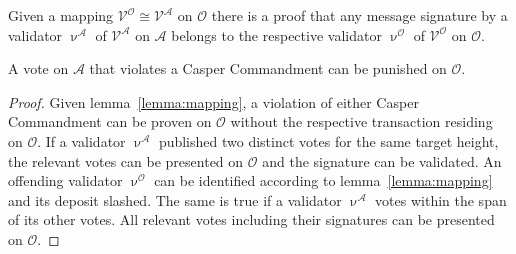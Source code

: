\documentclass[12pt,a4paper]{article}
\newcommand{\A}{\mathcal{A}}
\newcommand{\OC}{\mathcal{O}}
\newcommand{\V}{\mathcal{V}}
\begin{document}

\begin{lemma}
	\label{lemma:mapping}
	Given a mapping $\V^\OC\cong\V^\A$ on $\OC$
	there is a proof that any message signature by a validator $\upnu^\A$ of $\V^\A$ on $\A$ belongs to the respective validator $\upnu^\OC$ of $\V^\OC$ on $\OC$.
\end{lemma}

\begin{theorem}
	\label{theorem:remoteaccountability}
	A vote on $\A$ that violates a Casper Commandment can be punished on $\OC$.
	\begin{proof}
		Given lemma~\ref{lemma:mapping}, a violation of either Casper Commandment can be proven on $\OC$ without the respective transaction residing on $\OC$.
		If a validator $\upnu^\A$ published two distinct votes for the same target height, the relevant votes can be presented on $\OC$ and the signature can be validated.
		An offending validator $\upnu^\OC$ can be identified according to lemma~\ref{lemma:mapping} and its deposit slashed.
		The same is true if a validator $\upnu^\A$ votes within the span of its other votes.
		All relevant votes including their signatures can be presented on $\OC$.
	\end{proof}
\end{theorem}
\end{document}
